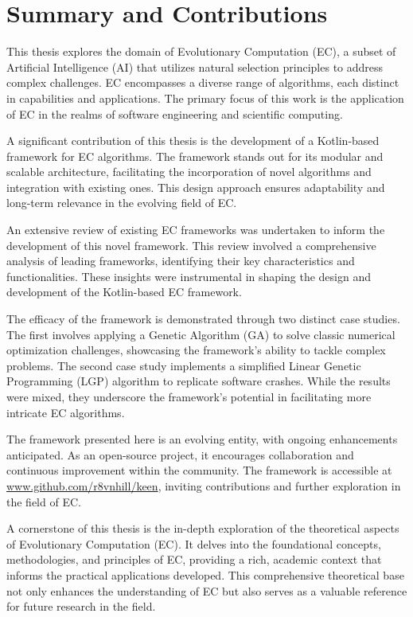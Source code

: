 \section{Summary and Contributions}
\label{sec:conclusions:summary}
    This thesis explores the domain of Evolutionary Computation (EC), a subset of Artificial Intelligence (AI) that 
    utilizes natural selection principles to address complex challenges. EC encompasses a diverse range of algorithms, 
    each distinct in capabilities and applications. The primary focus of this work is the application of EC in the 
    realms of software engineering and scientific computing.

    A significant contribution of this thesis is the development of a Kotlin-based framework for EC algorithms. The 
    framework stands out for its modular and scalable architecture, facilitating the incorporation of novel algorithms 
    and integration with existing ones. This design approach ensures adaptability and long-term relevance in the 
    evolving field of EC.

    An extensive review of existing EC frameworks was undertaken to inform the development of this novel framework. This 
    review involved a comprehensive analysis of leading frameworks, identifying their key characteristics and 
    functionalities. These insights were instrumental in shaping the design and development of the Kotlin-based EC 
    framework.

    The efficacy of the framework is demonstrated through two distinct case studies. The first involves applying a 
    Genetic Algorithm (GA) to solve classic numerical optimization challenges, showcasing the framework's ability to 
    tackle complex problems. The second case study implements a simplified Linear Genetic Programming (LGP) algorithm to 
    replicate software crashes. While the results were mixed, they underscore the framework's potential in facilitating 
    more intricate EC algorithms.

    The framework presented here is an evolving entity, with ongoing enhancements anticipated. As an open-source 
    project, it encourages collaboration and continuous improvement within the community. The framework is accessible at 
    \url{www.github.com/r8vnhill/keen}, inviting contributions and further exploration in the field of EC.

    A cornerstone of this thesis is the in-depth exploration of the theoretical aspects of Evolutionary Computation 
    (EC). It delves into the foundational concepts, methodologies, and principles of EC, providing a rich, academic 
    context that informs the practical applications developed. This comprehensive theoretical base not only enhances the 
    understanding of EC but also serves as a valuable reference for future research in the field.
    
